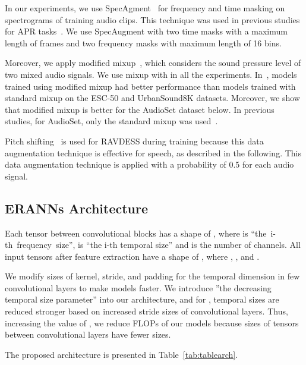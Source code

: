 \documentclass{article}
\begin{document}
\begin{sloppy}
In our experiments, we use SpecAgment~\cite{Park2019SpecAugmentAS} for frequency and time masking on spectrograms of training audio clips. This technique was used in previous studies for APR tasks~\cite{9229505, gong21b_interspeech}. We use SpecAugment with two time masks with a maximum length of  frames and two frequency masks with maximum length of 16 bins.
	
Moreover, we apply modified mixup~\cite{tokozume2018learning}, which considers the sound pressure level of two mixed audio signals. We use mixup with  in all the experiments. In~\cite{tokozume2018learning}, models trained using modified mixup had better performance than models trained with standard mixup on the ESC-50 and UrbanSound8K datasets. Moreover, we show that modified mixup is better for the AudioSet dataset below. In previous studies, for AudioSet, only the standard mixup was used~\cite{9229505, gong21b_interspeech, 9414229}.

Pitch shifting~\cite{810857} is used for RAVDESS during training because this data augmentation technique is effective for speech, as described in the following. This data augmentation technique is applied with a probability of 0.5 for each audio signal.


\subsection{ERANNs Architecture}
Each tensor between convolutional blocks has a shape of \mbox{}, where  is \hbox{``the i-th  frequency size''},  is ``the i-th temporal size'' and  is the number of channels. All input tensors after feature extraction have a shape of , where , , and .

We modify sizes of kernel, stride, and padding for the temporal dimension in few convolutional layers to make models faster. We introduce ''the decreasing temporal size parameter''  into our architecture, and for , temporal sizes  are reduced stronger based on increased stride sizes of convolutional layers. Thus, increasing the value of , we reduce FLOPs of our models because sizes of tensors between convolutional layers have fewer sizes. 

The proposed architecture is presented in Table~\ref{tab:tablearch}.


\end{sloppy}
\end{document}
